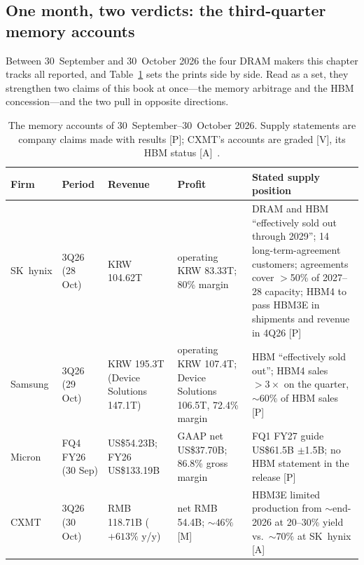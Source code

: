 \subsection{One month, two verdicts: the third-quarter memory accounts}
\label{sec:hw-memory-q3}

Between 30~September and 30~October 2026 the four DRAM makers this chapter tracks all reported, and Table~\ref{tab:hw-memory-q3} sets the prints side by side. Read as a set, they strengthen two claims of this book at once---the memory arbitrage and the HBM concession---and the two pull in opposite directions.

\begin{table}[htbp]
  \centering
  \small
  \caption{The memory accounts of 30~September--30~October 2026. Supply statements are company claims made with results [P]; CXMT's accounts are graded [V], its HBM status [A]~\cite{hw-skhynix-q3,hw-samsung-q3,hw-micron-fq4,hw-cxmt-q3,hw-cxmt-hbm3e}.}
  \label{tab:hw-memory-q3}
  \setlength{\tabcolsep}{4pt}
  \begin{tabular}{>{\raggedright\arraybackslash}p{17mm}>{\raggedright\arraybackslash}p{24mm}>{\raggedright\arraybackslash}p{27mm}>{\raggedright\arraybackslash}p{30mm}>{\raggedright\arraybackslash}p{47mm}}
    \toprule
    Firm & Period & Revenue & Profit & Stated supply position \\
    \midrule
    SK~hynix & 3Q26 (28 Oct) & KRW 104.62T & operating KRW 83.33T; 80\% margin & DRAM and HBM ``effectively sold out through 2029''; 14 long-term-agreement customers; agreements cover $>$50\% of 2027--28 capacity; HBM4 to pass HBM3E in shipments and revenue in 4Q26 [P] \\
    \addlinespace
    Samsung & 3Q26 (29 Oct) & KRW 195.3T (Device Solutions 147.1T) & operating KRW 107.4T; Device Solutions 106.5T, 72.4\% margin & 2027 HBM ``effectively sold out''; HBM4 sales $>3\times$ on the quarter, ${\sim}60\%$ of HBM sales [P] \\
    \addlinespace
    Micron & FQ4 FY26 (30 Sep) & US\$54.23B; FY26 US\$133.19B & GAAP net US\$37.70B; 86.8\% gross margin & FQ1 FY27 guide US\$61.5B $\pm$1.5B; no HBM statement in the release [P] \\
    \addlinespace
    CXMT & 3Q26 (30 Oct) & RMB 118.71B ($+613\%$ y/y) & net RMB 54.4B; ${\sim}46\%$ [M] & HBM3E limited production from ${\sim}$end-2026 at 20--30\% yield vs.\ ${\sim}70\%$ at SK~hynix [A] \\
    \bottomrule
  \end{tabular}
\end{table}

